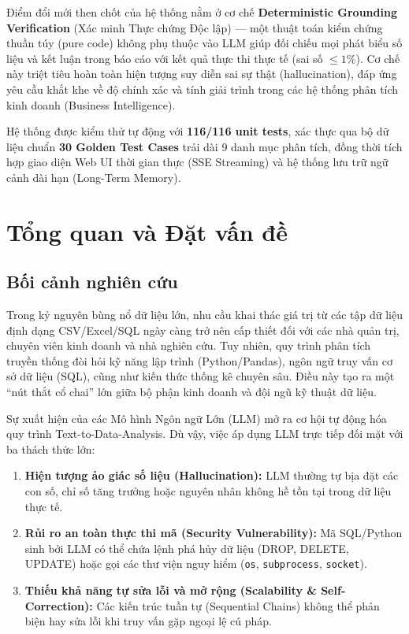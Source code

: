 \documentclass[12pt, a4paper]{article}
\begin{document}
Điểm đổi mới then chốt của hệ thống nằm ở cơ chế \textbf{Deterministic Grounding Verification} (Xác minh Thực chứng Độc lập) --- một thuật toán kiểm chứng thuần túy (pure code) không phụ thuộc vào LLM giúp đối chiếu mọi phát biểu số liệu và kết luận trong báo cáo với kết quả thực thi thực tế (sai số $\le 1\%$). Cơ chế này triệt tiêu hoàn toàn hiện tượng suy diễn sai sự thật (hallucination), đáp ứng yêu cầu khắt khe về độ chính xác và tính giải trình trong các hệ thống phân tích kinh doanh (Business Intelligence).

Hệ thống được kiểm thử tự động với \textbf{116/116 unit tests}, xác thực qua bộ dữ liệu chuẩn \textbf{30 Golden Test Cases} trải dài 9 danh mục phân tích, đồng thời tích hợp giao diện Web UI thời gian thực (SSE Streaming) và hệ thống lưu trữ ngữ cảnh dài hạn (Long-Term Memory).

\newpage

\tableofcontents
\newpage

\listoffigures
\newpage

\listoftables
\newpage

\section{Tổng quan và Đặt vấn đề}

\subsection{Bối cảnh nghiên cứu}
Trong kỷ nguyên bùng nổ dữ liệu lớn, nhu cầu khai thác giá trị từ các tập dữ liệu định dạng CSV/Excel/SQL ngày càng trở nên cấp thiết đối với các nhà quản trị, chuyên viên kinh doanh và nhà nghiên cứu. Tuy nhiên, quy trình phân tích truyền thống đòi hỏi kỹ năng lập trình (Python/Pandas), ngôn ngữ truy vấn cơ sở dữ liệu (SQL), cũng như kiến thức thống kê chuyên sâu. Điều này tạo ra một ``nút thắt cổ chai'' lớn giữa bộ phận kinh doanh và đội ngũ kỹ thuật dữ liệu.

Sự xuất hiện của các Mô hình Ngôn ngữ Lớn (LLM) mở ra cơ hội tự động hóa quy trình Text-to-Data-Analysis. Dù vậy, việc áp dụng LLM trực tiếp đối mặt với ba thách thức lớn:
\begin{enumerate}[label=\textbf{(\alph*)}]
    \item \textbf{Hiện tượng ảo giác số liệu (Hallucination):} LLM thường tự bịa đặt các con số, chỉ số tăng trưởng hoặc nguyên nhân không hề tồn tại trong dữ liệu thực tế.
    \item \textbf{Rủi ro an toàn thực thi mã (Security Vulnerability):} Mã SQL/Python sinh bởi LLM có thể chứa lệnh phá hủy dữ liệu (DROP, DELETE, UPDATE) hoặc gọi các thư viện nguy hiểm (\texttt{os}, \texttt{subprocess}, \texttt{socket}).
    \item \textbf{Thiếu khả năng tự sửa lỗi và mở rộng (Scalability \& Self-Correction):} Các kiến trúc tuần tự (Sequential Chains) không thể phản biện hay sửa lỗi khi truy vấn gặp ngoại lệ cú pháp.
\end{enumerate}
\end{document}
